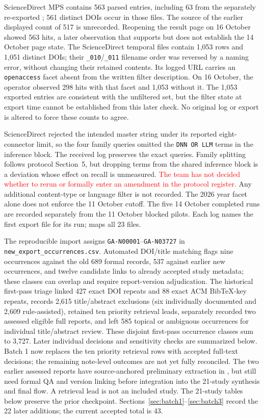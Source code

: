 \documentclass[12pt,a4paper]{article}
\newcommand{\pending}[1]{\textcolor{red}{#1}}
\begin{document}
ScienceDirect MPS contains 563 parsed entries, including 63 from the separately re-exported ; 561 distinct DOIs occur in those files. The source of the earlier displayed count of 517 is unrecorded. Reopening the result page on 16 October showed 563 hits, a later observation that supports but does not establish the 14 October page state. The ScienceDirect temporal files contain 1,053 rows and 1,051 distinct DOIs; their \texttt{\_010}/\texttt{\_011} filename order was reversed by a naming error, without changing their retained contents. Its logged URL carries an \texttt{openaccess} facet absent from the written filter description. On 16 October, the operator observed 298 hits with that facet and 1,053 without it. The 1,053 exported entries are consistent with the unfiltered set, but the filter state at export time cannot be established from this later check. No original log or export is altered to force these counts to agree.

ScienceDirect rejected the intended master string under its reported eight-connector limit, so the four family queries omitted the \texttt{DNN OR LLM} terms in the inference block. The received log preserves the exact queries. Family splitting follows protocol Section~5, but dropping terms from the shared inference block is a deviation whose effect on recall is unmeasured. \pending{The team has not decided whether to rerun or formally enter an amendment in the protocol register.} Any additional content-type or language filter is not recorded. The 2026 year facet alone does not enforce the 11 October cutoff. The five 14 October completed runs are recorded separately from the 11 October blocked pilots. Each log names the first export file for its run;  maps all 23 files.\par

The reproducible import assigns \texttt{GA-N00001}--\texttt{GA-N03727} in \texttt{new\_export\_occurrences.csv}. Automated DOI/title matching flags nine occurrences against the old 689 formal records, 537 against earlier new occurrences, and twelve candidate links to already accepted study metadata; these classes can overlap and require report-version adjudication. The historical first-pass triage linked 427 exact DOI repeats and 88 exact ACM BibTeX-key repeats, records 2,615 title/abstract exclusions (six individually documented and 2,609 rule-assisted), retained ten priority retrieval leads, separately recorded two assessed eligible full reports, and left 585 topical or ambiguous occurrences for individual title/abstract review. These disjoint first-pass occurrence classes sum to 3,727. Later individual decisions and sensitivity checks are summarized below. Batch 1 now replaces the ten priority retrieval rows with accepted full-text decisions; the remaining note-level outcomes are not yet fully reconciled. The two earlier assessed reports have source-anchored preliminary extraction in , but still need formal QA and version linking before integration into the 21-study synthesis and final flow. A retrieval lead is not an included study. The 21-study tables below preserve the prior checkpoint. Sections~\ref{sec:batch1}--\ref{sec:batch3} record the 22 later additions; the current accepted total is 43.
\end{document}

